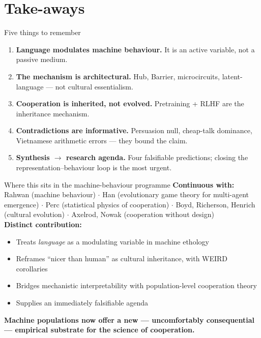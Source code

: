 \documentclass[11pt,aspectratio=169]{beamer}
\newcommand{\takeaway}[1]{%
  \begin{center}
    \colorbox{rsnavy!10}{%
      \begin{minipage}{0.92\textwidth}
        \centering\textbf{#1}
      \end{minipage}}
  \end{center}}
\begin{document}
\section{Take-aways}

\begin{frame}{Five things to remember}
    \large
    \begin{enumerate}
        \setlength\itemsep{0.5em}
        \item \textbf{Language modulates machine behaviour.} It is an active variable, not a passive medium.
        \item \textbf{The mechanism is architectural.} Hub, Barrier, microcircuits, latent-language --- not cultural essentialism.
        \item \textbf{Cooperation is inherited, not evolved.} Pretraining + RLHF are the inheritance mechanism.
        \item \textbf{Contradictions are informative.} Persuasion null, cheap-talk dominance, Vietnamese arithmetic errors --- they bound the claim.
        \item \textbf{Synthesis $\rightarrow$ research agenda.} Four falsifiable predictions; closing the representation--behaviour loop is the most urgent.
    \end{enumerate}
\end{frame}

\begin{frame}{Where this sits in the machine-behaviour programme}
    \large
    \textbf{Continuous with:}\\
    \footnotesize Rahwan (machine behaviour) $\cdot$ Han (evolutionary game theory for multi-agent emergence) $\cdot$ Perc (statistical physics of cooperation) $\cdot$ Boyd, Richerson, Henrich (cultural evolution) $\cdot$ Axelrod, Nowak (cooperation without design)
    \vspace{0.5cm}\\
    \normalsize\textbf{Distinct contribution:}
    \begin{itemize}
        \setlength\itemsep{0.3em}
        \item Treats \emph{language} as a modulating variable in machine ethology
        \item Reframes ``nicer than human'' as cultural inheritance, with WEIRD corollaries
        \item Bridges mechanistic interpretability with population-level cooperation theory
        \item Supplies an immediately falsifiable agenda
    \end{itemize}
    \vspace{0.5cm}
    \takeaway{Machine populations now offer a new --- uncomfortably consequential --- empirical substrate for the science of cooperation.}
\end{frame}
\end{document}
